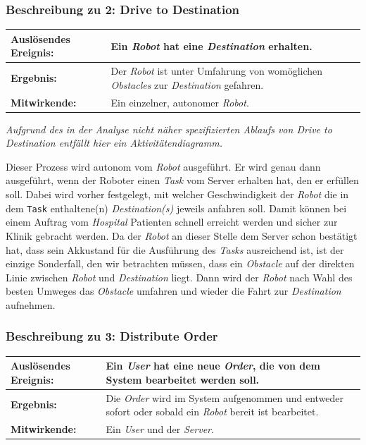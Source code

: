 			\subsubsection{Beschreibung zu 2: Drive to Destination}

			\begin{table}[H]
				\centering
				\begin{tabularx}{\textwidth}{|p{3cm}|X|}
				\hline
				\textbf{Auslösendes Ereignis:} & Ein \emph{Robot} hat eine \emph{Destination} erhalten.\\ \hline
				\textbf{Ergebnis:} & Der \emph{Robot} ist unter Umfahrung von womöglichen \emph{Obstacles} zur \emph{Destination} gefahren.\\ \hline
				\textbf{Mitwirkende:} &	Ein einzelner, autonomer \emph{Robot}. \\
				\hline
				\end{tabularx}
				\label{tab:2-4-drive-to-destination}
			\end{table}
			
			\emph{Aufgrund des in der Analyse nicht näher spezifizierten Ablaufs von \emph{Drive to Destination} 
			entfällt hier ein Aktivitätendiagramm.}

			Dieser Prozess wird autonom vom \emph{Robot} ausgeführt. 
			Er wird genau dann ausgeführt, wenn der Roboter einen \emph{Task} vom Server erhalten hat, den er erfüllen soll. 
			Dabei wird vorher festgelegt, mit welcher Geschwindigkeit der \emph{Robot} die in dem \texttt{Task} enthaltene(n) \emph{Destination(s)} jeweils anfahren soll. 
			Damit können bei einem Auftrag vom \emph{Hospital} Patienten schnell erreicht werden und sicher zur Klinik gebracht werden. 
			Da der \emph{Robot} an dieser Stelle dem Server schon bestätigt hat, dass sein Akkustand für die Ausführung des \emph{Tasks} ausreichend ist, 
			ist der einzige Sonderfall, den wir betrachten müssen, dass ein \emph{Obstacle} auf der direkten Linie zwischen \emph{Robot} und \emph{Destination} liegt. 
			Dann wird der \emph{Robot} nach Wahl des besten Umweges das \emph{Obstacle} umfahren und wieder die Fahrt zur \emph{Destination} aufnehmen.

			\subsubsection{Beschreibung zu 3: Distribute Order}

			\begin{table}[H]
				\centering
				\begin{tabularx}{\textwidth}{|p{3cm}|X|}
				\hline
				\textbf{Auslösendes Ereignis:} & Ein \emph{User} hat eine neue \emph{Order}, die von dem System bearbeitet werden soll.\\ \hline
				\textbf{Ergebnis:} & Die \emph{Order} wird im System aufgenommen und entweder sofort oder sobald ein \emph{Robot} bereit ist bearbeitet.\\ \hline
				\textbf{Mitwirkende:} &	Ein \emph{User} und der \emph{Server}. \\
				\hline
				\end{tabularx}
				\label{tab:2-4-distribute Order}
			\end{table}

